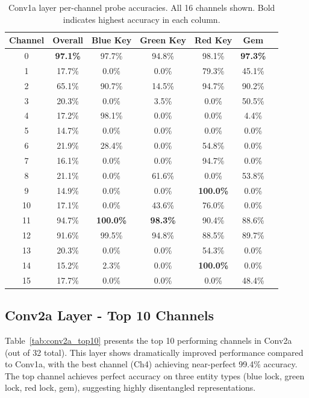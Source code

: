 \documentclass[12pt,a4paper]{report}
\begin{document}
\begin{table}[H]
\centering
\caption[Conv1a per-channel probe accuracies]{Conv1a layer per-channel probe accuracies. All 16 channels shown. Bold indicates highest accuracy in each column.}
\label{tab:conv1a_channels}
\begin{tabular}{ccccccc}
\toprule
Channel & Overall & Blue Key & Green Key & Red Key & Gem \\
\midrule
0 & \textbf{97.1\%} & 97.7\% & 94.8\% & 98.1\% & \textbf{97.3\%} \\
1 & 17.7\% & 0.0\% & 0.0\% & 79.3\% & 45.1\% \\
2 & 65.1\% & 90.7\% & 14.5\% & 94.7\% & 90.2\% \\
3 & 20.3\% & 0.0\% & 3.5\% & 0.0\% & 50.5\% \\
4 & 17.2\% & 98.1\% & 0.0\% & 0.0\% & 4.4\% \\
5 & 14.7\% & 0.0\% & 0.0\% & 0.0\% & 0.0\% \\
6 & 21.9\% & 28.4\% & 0.0\% & 54.8\% & 0.0\% \\
7 & 16.1\% & 0.0\% & 0.0\% & 94.7\% & 0.0\% \\
8 & 21.1\% & 0.0\% & 61.6\% & 0.0\% & 53.8\% \\
9 & 14.9\% & 0.0\% & 0.0\% & \textbf{100.0\%} & 0.0\% \\
10 & 17.1\% & 0.0\% & 43.6\% & 76.0\% & 0.0\% \\
11 & 94.7\% & \textbf{100.0\%} & \textbf{98.3\%} & 90.4\% & 88.6\% \\
12 & 91.6\% & 99.5\% & 94.8\% & 88.5\% & 89.7\% \\
13 & 20.3\% & 0.0\% & 0.0\% & 54.3\% & 0.0\% \\
14 & 15.2\% & 2.3\% & 0.0\% & \textbf{100.0\%} & 0.0\% \\
15 & 17.7\% & 0.0\% & 0.0\% & 0.0\% & 48.4\% \\
\bottomrule
\end{tabular}
\end{table}

\subsection{Conv2a Layer - Top 10 Channels}

Table~\ref{tab:conv2a_top10} presents the top 10 performing channels in Conv2a (out of 32 total). This layer shows dramatically improved performance compared to Conv1a, with the best channel (Ch4) achieving near-perfect 99.4\% accuracy. The top channel achieves perfect accuracy on three entity types (blue lock, green lock, red lock, gem), suggesting highly disentangled representations.
\end{document}
